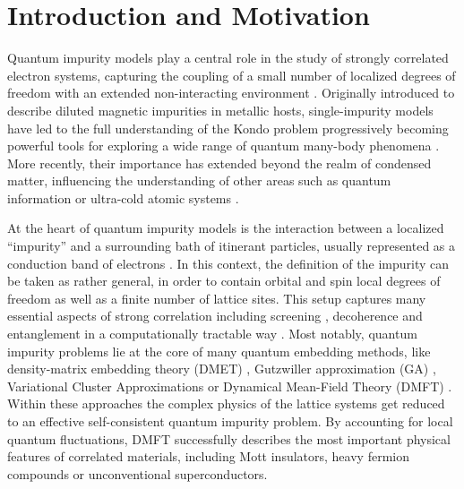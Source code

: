 \documentclass[edipack_sp.tex]{subfiles}
\begin{document}
\section{Introduction and Motivation}\label{SecIntro}
Quantum impurity models play a central role in the study of strongly correlated electron systems, capturing the coupling of a small number of localized degrees of freedom with an extended non-interacting environment \cite{Nozieres1980JP,Hewson1993}. 
Originally introduced to describe diluted magnetic impurities in metallic hosts, single-impurity models have led to the full understanding of the Kondo problem \cite{Anderson1961PR,Kondo1964POTP,Schrieffer1966PR} progressively becoming powerful tools for exploring a wide range of quantum many-body phenomena \cite{Wilson1975RMP,Georges1996RMP,Kotliar2004PT,Kotliar2006RMP}. More recently, their importance has extended beyond the realm of condensed matter, influencing the understanding of other areas such as quantum information \cite{Su2013MPLB,Walsh2019PRL,Walsh2020PQ,Walsh2021PNAS,Bellomia2024PRB} or ultra-cold atomic systems \cite{Dao2007PRL,Amaricci2014PRA,Del-Re2018PRA,Walsh2019PRB,Tusi2022NP}.


At the heart of quantum impurity models is the interaction between a localized ``impurity''  and a surrounding bath of itinerant particles, usually represented as a conduction band of electrons \cite{Hewson1993}. In this context, the definition of the impurity can be taken as rather general, in order to contain orbital and spin local degrees of freedom as well as a finite number of lattice sites. 
This setup captures many essential aspects of strong correlation including screening \cite{Roekeghem2014PRL,Roekeghem2014EL,Werner2016JOPCM,Tomczak2017TEPJST}, decoherence and entanglement in a computationally tractable way \cite{Walsh2021PNAS,Bellomia2024PRB}.
Most notably, quantum impurity problems lie at the core of many quantum embedding methods, like density-matrix embedding theory (DMET) \cite{Knizia2012PRL}, Gutzwiller approximation (GA) \cite{Lanata2015PRX,Mejuto-Zaera2023PRB},
Variational Cluster Approximations \cite{Potthoff2003TEPJBCMACS,Senechal2008,Potthoff2011ACP,Nuss2011,Dionne2023SPC,Dionne2023SPCa}
or Dynamical Mean-Field Theory (DMFT) \cite{Georges1996RMP, Kotliar2004PT,Kotliar2006RMP}.
Within these approaches the complex physics of the lattice systems get reduced to an effective self-consistent quantum impurity problem.
By accounting for local quantum fluctuations, DMFT successfully describes the most important physical features of correlated materials, including Mott insulators, heavy fermion compounds or unconventional superconductors.  
\end{document}
